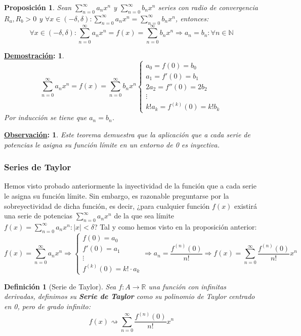 \documentclass[10pt,a4paper,openright]{book}
\theoremstyle{break}
\newtheorem*{defi}{Definición}
\newtheorem*{prop}{Proposición}
\newtheorem*{demo}{\underline{Demostración}:}
\newtheorem*{obs}{\underline{Observación}:}
\begin{document}
\begin{prop}
Sean $\sum_{n=0}^{\infty} a_n x^n$ y $\sum_{n=0}^{\infty} b_n x^n$ series con radio de convergencia $R_a, R_b >0$ y $\forall x \in (-\delta, \delta) : \sum_{n=0}^{\infty} a_n x^n = \sum_{n=0}^{\infty} b_n x^n$, entonces:
$$\forall x \in (-\delta, \delta) : \sum_{n=0}^{\infty} a_n x^n = f(x)=\sum_{n=0}^{\infty} b_n x^n \Rightarrow a_n = b_n : \forall n \in \mathbb{N}$$
\end{prop}
\begin{demo}
$$\sum_{n=0}^{\infty} a_n x^n = f(x) = \sum_{n=0}^{\infty} b_n x^n \begin{cases} a_0 = f(0) = b_0 \\ a_1 = f'(0) = b_1 \\ 2 a_2 = f''(0) = 2 b_2 \\ \vdots \\ k! a_k = f^{(k)}(0) = k! b_k \end{cases}$$
Por inducción se tiene que $a_n = b_n$.
\end{demo}

\begin{obs}
Este teorema demuestra que la aplicación que a cada serie de potencias le asigna su función límite en un entorno de 0 es inyectiva.
\end{obs}

\subsubsection{Series de Taylor}
Hemos visto probado anteriormente la inyectividad de la función que a cada serie le asigna su función límite. Sin embargo, es razonable preguntarse por la sobreyectividad de dicha función, es decir, ¿para cualquier función $f(x)$ existirá una serie de potencias $\sum_{n= 0}^{\infty} a_n x^n $ de la que sea límite $f(x) = \sum_{n= 0}^{\infty} a_n x^n : |x| < \delta$? Tal y como hemos visto en la proposición anterior:
$$f(x) = \sum_{n= 0}^{\infty} a_n x^n \Rightarrow \begin{cases} f(0) = a_0 \\ f'(0) = a_1 \\ \vdots \\ f^{(k)}(0) = k! \cdot a_k 
\end{cases} \Rightarrow a_n = \frac{f^{(n)}(0)}{n!} \Rightarrow f(x) = \sum_{n=0}^{\infty} \frac{f^{(n)}(0)}{n!} x^n$$

\begin{defi}[Serie de Taylor]
Sea $f: A \rightarrow \mathbb{R}$ una función con infinitas derivadas, definimos su \textbf{Serie de Taylor} como su polinomio de Taylor centrado en 0, pero de grado infinito:
$$f(x) \rightsquigarrow \sum_{n=0}^{\infty} \frac{f^{(n)}(0)}{n!} x^n $$
\end{defi}
\end{document}
